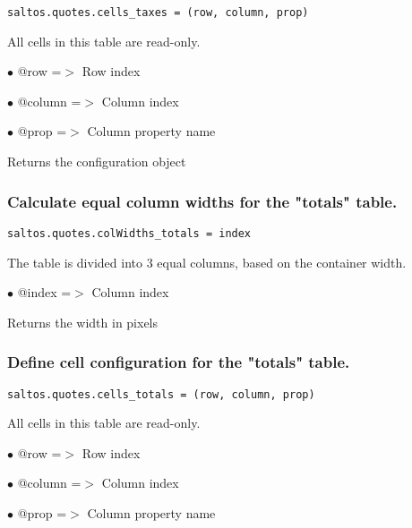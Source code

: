 \documentclass[a4paper]{article}
\begin{document}
\begin{lstlisting}
saltos.quotes.cells_taxes = (row, column, prop)
\end{lstlisting}

All cells in this table are read-only.

\begin{compactitem}
\item[\color{myblue}$\bullet$] @row    =$>$ Row index
\item[\color{myblue}$\bullet$] @column =$>$ Column index
\item[\color{myblue}$\bullet$] @prop   =$>$ Column property name
\end{compactitem}

Returns the configuration object

\hypertarget{toc45}{}
\subsubsection{Calculate equal column widths for the "totals" table.}

\begin{lstlisting}
saltos.quotes.colWidths_totals = index
\end{lstlisting}

The table is divided into 3 equal columns, based on the container width.

\begin{compactitem}
\item[\color{myblue}$\bullet$] @index =$>$ Column index
\end{compactitem}

Returns the width in pixels

\hypertarget{toc46}{}
\subsubsection{Define cell configuration for the "totals" table.}

\begin{lstlisting}
saltos.quotes.cells_totals = (row, column, prop)
\end{lstlisting}

All cells in this table are read-only.

\begin{compactitem}
\item[\color{myblue}$\bullet$] @row    =$>$ Row index
\item[\color{myblue}$\bullet$] @column =$>$ Column index
\item[\color{myblue}$\bullet$] @prop   =$>$ Column property name
\end{compactitem}
\end{document}
